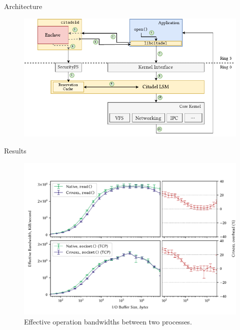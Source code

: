 \documentclass[xcolor=dvipsnames]{beamer}
\begin{document}
\begin{frame}{Architecture}
\begin{figure}[]
    \centering
    \includegraphics[width=\linewidth]{../figures/OverallArchitecture.pdf}
    \label{fig:citadel-overview}
\end{figure}
\end{frame}



\begin{frame}{Results}
    \begin{figure}[]
        \centering
        \includegraphics[width=0.9\linewidth]{../figures/graphs/perf-pres.pdf}
        \vspace{1mm}
        \caption{Effective operation bandwidths between two processes.}
        \label{fig:citadel-overview}
    \end{figure}
\end{frame}
\end{document}
